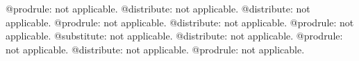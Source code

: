 \documentclass[11pt]{article}
\begin{document}
@prodrule: not applicable.
@distribute: not applicable.
@distribute: not applicable.
@prodrule: not applicable.
@distribute: not applicable.
@prodrule: not applicable.
@substitute: not applicable.
@distribute: not applicable.
@prodrule: not applicable.
@distribute: not applicable.
@prodrule: not applicable.
\end{document}
